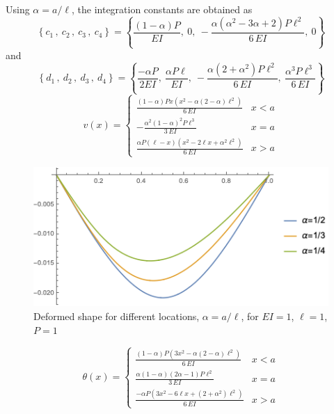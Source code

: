 \documentclass[11pt, oneside]{article}   	%
\begin{document}
Using $\alpha=a/\ell$, the integration constants are obtained as
\begin{equation}
   \left\{ 
    c_1 \,,~
    c_2 \,,~
    c_3 \,,~
    c_4 
   \right\}
   =
   \left\{
   	\frac{ (1-\alpha)  P}{{EI}},~
	0,~
	-\frac{ \alpha  \left(\alpha ^2-3 \alpha +2\right) P \ell^2 }{6 \,{EI}},~
   	0
   \right\}
   \label{B8}
\end{equation}
and
\begin{equation}
   \left\{ 
    d_1 \,,~
    d_2 \,,~
    d_3 \,,~
    d_4
   \right\}
   =
   \left\{
	\frac{ -\alpha  P}{2 {EI}},~
	\frac{\alpha  P \ell }{{EI}},~
	-\frac{ \alpha  \left(2+\alpha^2\right) P \ell^2 }{6 \,{EI}},~
	\frac{\alpha^3  P \ell^3}{6 \,{EI}}
   \right\}
   \label{B9}
\end{equation}
\begin{equation}
   v(x) = \left\{ \begin{array}{ll}
                       \frac{(1-\alpha)Px(x^2 - \alpha(2-\alpha)\ell^2)}{6\,EI}  & x<a \\[2ex]
                       -\frac{\alpha^2(1-\alpha)^2P\ell^3 }{3\,EI}  & x=a \\[2ex]
                       \frac{\alpha P(\ell - x)(x^2 - 2 \ell x + \alpha^2\ell^2)}{6\,EI}  & x>a 
                      \end{array} \right.
   \label{B10}
\end{equation}

\begin{figure}[htbp]
    \begin{center}
        \includegraphics[]{forceDeflection.png}
        \caption{Deformed shape for different locations, $\alpha=a/\ell$, for $EI=1$, $\ell=1$, $P=1$}
        \label{default1}
    \end{center}
\end{figure}

\begin{equation}
   \theta(x) = \left\{ \begin{array}{ll}
                       \frac{(1-\alpha)P( 3 x^2 - \alpha(2-\alpha)\ell^2)}{6\,EI}  & x<a \\[2ex]
                       \frac{\alpha(1-\alpha)( 2 \alpha - 1 )P\ell^2}{3\,EI}  & x=a \\[2ex]
                        \frac{-\alpha P(3 x^2-6\ell x+(2+\alpha^2)\ell^2)}{6\,EI}   & x>a 
                      \end{array} \right.
   \label{B11}
\end{equation}
\end{document}
